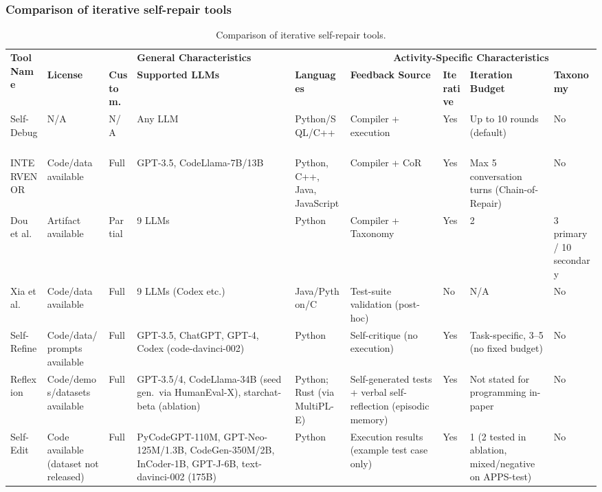 \documentclass[10pt,a4paper]{article}
\begin{document}
\subsubsection{Comparison of iterative self-repair tools}
\begin{table}[!t]
\centering
\caption{Comparison of iterative self-repair tools.}
\label{tab:cmp_repair}
\footnotesize
\setlength{\tabcolsep}{2.5pt}
\renewcommand{\arraystretch}{1.12}
\begin{tabularx}{\textwidth}{@{}p{48pt}p{48pt}p{28pt}p{68pt}p{48pt}p{65pt}p{30pt}p{72pt}X@{}}
\toprule
\multirow{2}{*}{\textbf{Tool Name}} & \multicolumn{4}{c}{\textbf{General Characteristics}} & \multicolumn{4}{c}{\textbf{Activity-Specific Characteristics}} \\
\cmidrule(lr){2-5} \cmidrule(lr){6-9}
 & \textbf{License} & \textbf{Custom.} & \textbf{Supported LLMs} & \textbf{Languages} & \textbf{Feedback Source} & \textbf{Iterative} & \textbf{Iteration Budget} & \textbf{Taxonomy} \\
\midrule
Self-Debug~\cite{chen2023selfdebug} & N/A & N/A & Any LLM & Python/SQL/C++ & Compiler + execution & Yes & Up to 10 rounds (default) & No \\
INTERVENOR~\cite{wang2024intervenor} & Code/data available & Full & GPT-3.5, CodeLlama-7B/13B & Python, C++, Java, JavaScript & Compiler + CoR & Yes & Max 5 conversation turns (Chain-of-Repair) & No \\
Dou et al.~\cite{dou2026} & Artifact available & Partial & 9 LLMs & Python & Compiler + Taxonomy & Yes & 2 & 3 primary / 10 secondary \\
Xia et al.~\cite{xia2023apr} & Code/data available & Full & 9 LLMs (Codex etc.) & Java/Python/C & Test-suite validation (post-hoc) & No & N/A & No \\
Self-Refine~\cite{madaan2023} & Code/data/prompts available & Full & GPT-3.5, ChatGPT, GPT-4, Codex (code-davinci-002) & Python & Self-critique (no execution) & Yes & Task-specific, 3--5 (no fixed budget) & No \\
Reflexion~\cite{shinn2023} & Code/demos/datasets available & Full & GPT-3.5/4, CodeLlama-34B (seed gen.\ via HumanEval-X), starchat-beta (ablation) & Python; Rust (via MultiPL-E) & Self-generated tests + verbal self-reflection (episodic memory) & Yes & Not stated for programming in-paper & No \\
Self-Edit~\cite{zhang2023selfedit} & Code available (dataset not released) & Full & PyCodeGPT-110M, GPT-Neo-125M/1.3B, CodeGen-350M/2B, InCoder-1B, GPT-J-6B, text-davinci-002 (175B) & Python & Execution results (example test case only) & Yes & 1 (2 tested in ablation, mixed/negative on APPS-test) & No \\

\end{tabularx}
\end{table}
\end{document}
